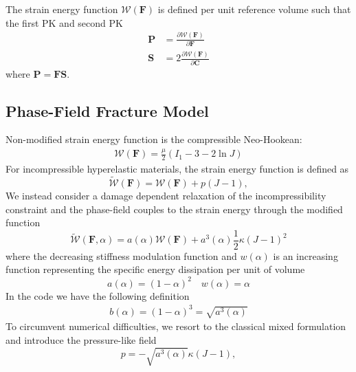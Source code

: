 \documentclass[12pt,3p]{article}
\numberwithin{equation}{section}
\begin{document}
The strain energy function $\mathcal{W}(\mathbf{F})$ is defined per unit reference volume such that the first PK and second PK
\begin{subequations}\label{EqPK}
\begin{align}
\mathbf{P} &= \frac{\partial \mathcal{W}(\mathbf{F})}{\partial \mathbf{F}} \\
\mathbf{S} &= 2 \frac{\partial \mathcal{W}(\mathbf{F})}{\partial \mathbf{C}}
\end{align}
\end{subequations}
where $\mathbf{P}=\mathbf{F}\mathbf{S}$. 

\subsection{Phase-Field Fracture Model}
Non-modified strain energy function is the compressible Neo-Hookean:
\begin{align}\label{StrainEnergyNH}
\mathcal{W}(\mathbf{F}) = \frac{\mu}{2} (I_1 - 3 - 2 \ln J)
\end{align}
For incompressible hyperelastic materials, the strain energy function  is defined as
\begin{equation}\label{EqEnergyIncompressible}
\widetilde{\mathcal{W}}(\mathbf{F}) = \mathcal{W}(\mathbf{F}) + p\left(J-1\right),
\end{equation}
We instead consider a damage dependent relaxation of the incompressibility constraint and the phase-field couples to the strain energy through the modified function 
\begin{equation}\label{EqEnergyRelaxed}
\widetilde{\mathcal{W}}(\mathbf{F},\alpha) = a(\alpha)\mathcal{W}(\mathbf{F}) + a^3(\alpha)\frac{1}{2}\kappa\left(J-1\right)^2
\end{equation}
where the decreasing stiffness modulation function and $w(\alpha)$ is an increasing function representing the specific energy dissipation per unit of volume
\begin{equation}\label{EqStiffMod}
a (\alpha) = (1 - \alpha)^2 \quad w(\alpha) = \alpha
\end{equation}
In the code we have the following definition
\begin{align*}
b (\alpha) = (1 - \alpha)^3 = \sqrt{a^3(\alpha)}
\end{align*}
To circumvent numerical difficulties, we resort to the classical mixed formulation and introduce the pressure-like field 
\begin{equation}\label{eq_pressure}
p = -\sqrt{a^3(\alpha)}\kappa\left(J-1\right),
\end{equation}
\end{document}
